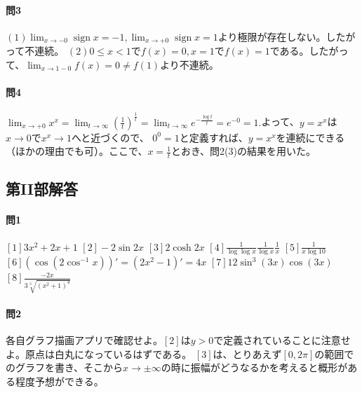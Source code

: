 \documentclass[a4j,dvipdfmx]{jsarticle}
\newcommand{\sign}{\mathop{\mathrm{sign}}\nolimits}
\begin{document}
                    \paragraph{問3}$(1)\displaystyle\lim_{x\to -0}\sign x =-1,\lim_{x\to+0}\sign x = 1$より極限が存在しない。したがって不連続。\hspace{1mm}
                        $(2)\displaystyle 0\leq x<1$で$f(x)=0,x=1$で$f(x)=1$である。したがって、$\displaystyle \lim_{x\to1-0}f(x)=0\neq f(1)$より不連続。

                    \paragraph{問4}$\displaystyle \lim_{x\to+0}x^x = \lim_{t\to\infty}\left(\frac{1}{t}\right)^{\frac{1}{t}}=\lim_{t\to\infty}e^{-\frac{\log t}{t}}=e^{-0}=1.$よって、$y=x^x$は$x\to 0$で$x^x\to 1$へと近づくので、
                    $0^0=1$と定義すれば、$y=x^x$を連続にできる（ほかの理由でも可）。ここで、$x=\frac{1}{t}$とおき、問2(3)の結果を用いた。
            \clearpage
            \subsection*{第II部解答}        
                \paragraph{問1}
                    $[1]3x^2+2x+1$\hspace{1mm}
                    $[2]-2\sin 2x$\hspace{1mm}
                    $[3]2\cosh 2x$\hspace{1mm}
                    $[4]\frac{1}{\log\log x}\frac{1}{\log x}\frac{1}{x}$\hspace{1mm}
                    $[5]\frac{1}{x\log 10}$\\
                    $[6](\cos(2\cos^{-1}x))'=(2x^2-1)'=4x$\hspace{1mm}
                    $[7]12\sin^3(3x)\cos(3x)$\hspace{1mm}
                    $[8]\displaystyle \frac{-2x}{3\sqrt[3]{(x^2+1)^4}}$
                
                \paragraph{問2}各自グラフ描画アプリで確認せよ。$[2]$は$y>0$で定義されていることに注意せよ。原点は白丸になっているはずである。
                $[3]$は、とりあえず$[0,2\pi]$の範囲でのグラフを書き、そこから$x\to \pm\infty$の時に振幅がどうなるかを考えると概形がある程度予想ができる。
\end{document}
